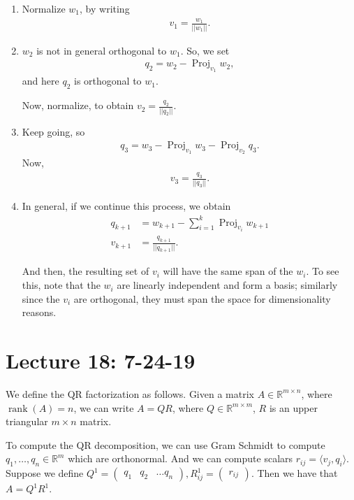 \documentclass{article}
\newcommand{\mat}[1]{\begin{pmatrix}#1\end{pmatrix}}
\newcommand{\RR}{\mathbb{R}}
\DeclareMathOperator{\rank}{rank}
\DeclareMathOperator{\Proj}{Proj}
\begin{document}
\begin{enumerate}
  \item Normalize $w_1$, by writing
    \begin{align*}
      v_1 = \frac{w_1}{ ||w_1||}.
    \end{align*}
  \item $w_2$ is not in general orthogonal to $w_1$.  So, we set
    \begin{align*}
      q_2 = w_2 - \Proj_{v_1} w_2,
    \end{align*}
    and here $q_2$ is orthogonal to $w_1$.

    Now, normalize, to obtain $v_2 = \frac{q_2}{||q_2||}$.
  \item Keep going, so
    \begin{align*}
      q_3 = w_3 - \Proj_{v_1} w_3 - \Proj_{v_2} q_3.
    \end{align*}
    Now,
    \begin{align*}
      v_3 = \frac{q_3}{||q_3||}.
    \end{align*}
  \item In general, if we continue this process, we obtain
    \begin{align*}
      q_{k+1} &= w_{k+1} - \sum_{i=1}^{k} \Proj_{v_i} w_{k+1} \\
      v_{k+1} &= \frac{q_{k+1}}{||q_{k+1}||}.
    \end{align*}

    And then, the resulting set of $v_i$ will have the same span of the $w_i$.  To see this, note that the $w_i$ are linearly independent and form a basis; similarly since the $v_i$ are orthogonal, they must span the space for dimensionality reasons.



\end{enumerate}

\section{Lecture 18: 7-24-19}

We define the QR factorization as follows.  Given a matrix $A \in \RR^{m \times n}$, where $\rank(A) = n$, we can write $A = QR$, where $Q \in \RR^{m \times m}$, $R$ is an upper triangular $m \times n$ matrix.

To compute the QR decomposition, we can use Gram Schmidt to compute $q_1, \dots, q_n \in \RR^m$ which are orthonormal.   And we can compute scalars $r_{ij} = \langle v_j, q_i \rangle$.  Suppose we define  $Q^1 = \mat{q_1 & q_2 & \dots q_n}, R^1_{ij} = \mat{r_{ij}}$.  Then we have that $A = Q^1 R^1$.
\end{document}
